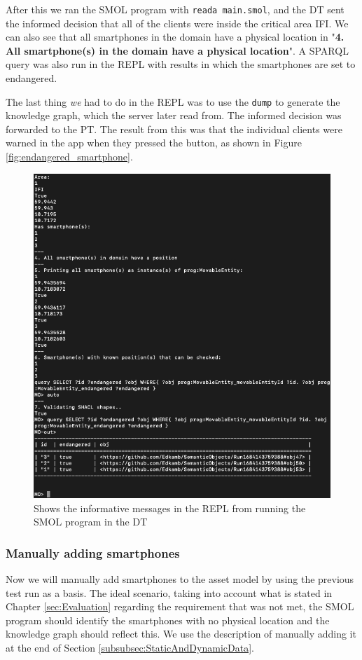 \documentclass{article}
\begin{document}
After this we ran the SMOL program with \verb|reada main.smol|, and the DT sent the informed decision that all of the clients were inside the critical area IFI. We can also see that all smartphones in the domain have a physical location in "\textbf{4. All smartphone(s) in the domain have a physical location}". A SPARQL query was also run in the REPL with results in which the smartphones are set to endangered.

The last thing \emph{we} had to do in the REPL was to use the \verb|dump| to generate the knowledge graph, which the server later read from. The informed decision was forwarded to the PT. The result from this was that the individual clients were warned in the app when they pressed the button, as shown in Figure \ref{fig:endangered_smartphone}.

\begin{figure}[H]
    \centering
    \includegraphics[scale=0.50]{graphics/digital_twin_repl.png}
    \caption{Shows the informative messages in the REPL from running the SMOL program in the DT}
    \label{fig:digital_twin_repl}
\end{figure}


 
\subsubsection{Manually adding smartphones}
Now we will manually add smartphones to the asset model by using the previous test run as a basis. The ideal scenario, taking into account what is stated in Chapter \ref{sec:Evaluation} regarding the requirement that was not met, the SMOL program should identify the smartphones with no physical location and the knowledge graph should reflect this. We use the description of manually adding it at the end of Section \ref{subsubsec:StaticAndDynamicData}. 
\end{document}
